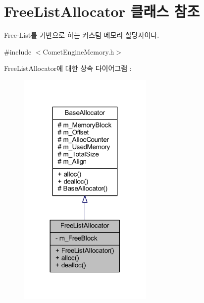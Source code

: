 \hypertarget{class_comet_engine_1_1_core_1_1_memory_1_1_free_list_allocator}{}\section{Free\+List\+Allocator 클래스 참조}
\label{class_comet_engine_1_1_core_1_1_memory_1_1_free_list_allocator}


Free-\/\+List를 기반으로 하는 커스텀 메모리 할당자이다.  




{\ttfamily \#include $<$Comet\+Engine\+Memory.\+h$>$}



Free\+List\+Allocator에 대한 상속 다이어그램 \+: \nopagebreak
\begin{figure}[H]
\begin{center}
\leavevmode
\includegraphics[width=185pt]{class_comet_engine_1_1_core_1_1_memory_1_1_free_list_allocator__inherit__graph}
\end{center}
\end{figure}


